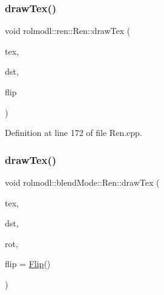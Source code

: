 \subsubsection{\texorpdfstring{drawTex()}{drawTex()}\hspace{0.1cm}{\footnotesize\ttfamily [20/36]}}
{\footnotesize\ttfamily void rolmodl\+::ren\+::\+Ren\+::draw\+Tex (\begin{DoxyParamCaption}\item[{Tex \&}]{tex,  }\item[{const \mbox{\hyperlink{structrolmodl_1_1blend_mode_1_1_dst_rect_x_y}{Dst\+Rect\+XY}}}]{dst,  }\item[{const \mbox{\hyperlink{structrolmodl_1_1blend_mode_1_1_flip}{Flip}}}]{flip }\end{DoxyParamCaption})}



Definition at line 172 of file Ren.\+cpp.

\mbox{\label{classrolmodl_1_1blend_mode_1_1_ren_a4d20c09728b60043353d37667f1b307e}} 
\subsubsection{\texorpdfstring{drawTex()}{drawTex()}\hspace{0.1cm}{\footnotesize\ttfamily [21/36]}}
{\footnotesize\ttfamily void rolmodl\+::blend\+Mode\+::\+Ren\+::draw\+Tex (\begin{DoxyParamCaption}\item[{Tex \&}]{tex,  }\item[{const \mbox{\hyperlink{structrolmodl_1_1blend_mode_1_1_dst_rect_w_h}{Dst\+Rect\+WH}}}]{dst,  }\item[{const double}]{rot,  }\item[{const \mbox{\hyperlink{structrolmodl_1_1blend_mode_1_1_flip}{Flip}}}]{flip = {\ttfamily \mbox{\hyperlink{structrolmodl_1_1blend_mode_1_1_flip}{Flip}}()} }\end{DoxyParamCaption})}

\mbox{\label{classrolmodl_1_1blend_mode_1_1_ren_aeee16e798cab40b87691a697e77d238a}} 
